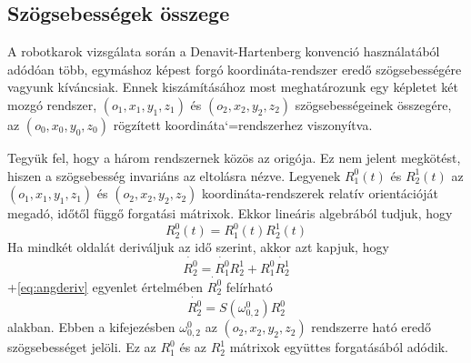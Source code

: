 \documentclass[12pt,a4paper]{report}
\theoremstyle{remark}
\theoremstyle{definition}
\begin{document}
\subsection{Szögsebességek összege}
A robotkarok vizsgálata során a Denavit-Hartenberg konvenció használatából adódóan több, egymáshoz képest forgó 
koordináta-rendszer eredő szögsebességére vagyunk kíváncsiak. Ennek kiszámításához most meghatározunk egy képletet 
két mozgó rendszer, $(o_1, x_1, y_1, z_1)$ és $(o_2, x_2, y_2, z_2)$ szögsebességeinek összegére, az 
$(o_0, x_0, y_0, z_0)$ rögzített koordináta`=rendszerhez viszonyítva.

Tegyük fel, hogy a három rendszernek közös az origója. Ez nem jelent megkötést, hiszen a szögsebesség invariáns az 
eltolásra nézve. Legyenek $R^{0}_{1}(t)$ és $R^{1}_{2}(t)$ az $(o_1, x_1, y_1, z_1)$ és $(o_2, x_2, y_2, z_2)$ 
koordináta-rendszerek relatív orientációját megadó, időtől függő forgatási mátrixok. Ekkor lineáris algebrából 
tudjuk, hogy
\begin{equation}
R^{0}_{2}(t) = R^{0}_{1}(t) R^{1}_{2}(t)
\end{equation}
Ha mindkét oldalát deriváljuk az idő szerint, akkor azt kapjuk, hogy
\begin{equation} \label{eq:rotprodderiv}
\dot{R^{0}_{2}} = \dot{R^{0}_{1}} R^{1}_{2} + R^{0}_{1} \dot{R^{1}_{2}}
\end{equation}
\Az+\eqref{eq:angderiv} egyenlet értelmében $\dot{R^{0}_{2}}$ felírható
\begin{equation}
\dot{R^{0}_{2}} = S(\omega^{0}_{0,2}) R^{0}_{2}
\end{equation}
alakban. Ebben a kifejezésben $\omega^{0}_{0,2}$ az $(o_2, x_2, y_2, z_2)$ rendszerre ható eredő szögsebességet 
jelöli. Ez az $R^{0}_{1}$ és az $R^{1}_{2}$ mátrixok együttes forgatásából adódik.
\end{document}
